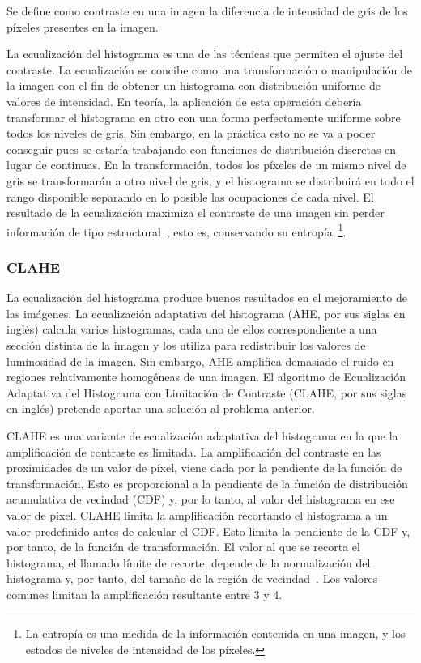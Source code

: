 \begin{definition}
	Se define como contraste en una imagen la diferencia de intensidad de gris de los píxeles presentes en la imagen.
\end{definition}

La ecualización del histograma es una de las técnicas que permiten el ajuste del contraste. La ecualización se concibe como una transformación o manipulación de la imagen con el fin de obtener un histograma con distribución uniforme de valores de intensidad. En teoría, la aplicación de esta operación debería transformar el histograma en otro con una forma perfectamente uniforme sobre todos los niveles de gris. Sin embargo, en la práctica esto no se va a poder conseguir pues se estaría trabajando con funciones de distribución discretas en lugar de continuas. En la transformación, todos los píxeles de un mismo nivel de gris se transformarán a otro nivel de gris, y el histograma se distribuirá en todo el rango disponible separando en lo posible las ocupaciones de cada nivel. El resultado de la ecualización maximiza el contraste de una imagen sin perder información de tipo estructural~\cite{solomon2011fundamentals}, esto es, conservando su entropía~\footnote{La entropía es una medida de la información contenida en una imagen, y los estados de niveles de intensidad de los píxeles.}.

\subsubsection{CLAHE}

La ecualización del histograma produce buenos resultados en el mejoramiento de las imágenes. La ecualización adaptativa del histograma (AHE, por sus siglas en inglés) calcula varios histogramas, cada uno de ellos correspondiente a una sección distinta de la imagen y los utiliza para redistribuir los valores de luminosidad de la imagen.  Sin embargo, AHE amplifica demasiado el ruido en regiones relativamente homogéneas de una imagen. El algoritmo de Ecualización Adaptativa del Histograma con Limitación de Contraste (CLAHE, por sus siglas en inglés) pretende aportar una solución al problema anterior. 

CLAHE es una variante de ecualización adaptativa del histograma en la que la amplificación de contraste es limitada. La amplificación del contraste en las proximidades de un valor de píxel, viene dada por la pendiente de la función de transformación. Esto es proporcional a la pendiente de la función de distribución acumulativa de vecindad (CDF) y, por lo tanto, al valor del histograma en ese valor de píxel.  CLAHE limita la amplificación recortando el histograma a un valor predefinido antes de calcular el CDF. Esto limita la pendiente de la CDF y, por tanto, de la función de transformación. El valor al que se recorta el histograma, el llamado límite de recorte, depende de la normalización del histograma y, por tanto, del tamaño de la región de vecindad~\cite{pizer1987adaptive}. Los valores comunes limitan la amplificación resultante entre 3 y 4.
 
